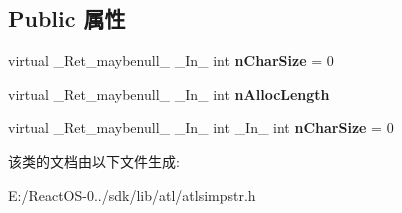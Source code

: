 \subsection*{Public 属性}
\begin{DoxyCompactItemize}
\item 
\mbox{\label{class_a_t_l_1_1_i_atl_string_mgr_a20e9f6b0e07ebb5f1c0db7318c32667d}} 
virtual \+\_\+\+Ret\+\_\+maybenull\+\_\+ \+\_\+\+In\+\_\+ int {\bfseries n\+Char\+Size} = 0
\item 
\mbox{\label{class_a_t_l_1_1_i_atl_string_mgr_aecb8a30e02b2c7e93bdbe5df70f49eec}} 
virtual \+\_\+\+Ret\+\_\+maybenull\+\_\+ \+\_\+\+In\+\_\+ int {\bfseries n\+Alloc\+Length}
\item 
\mbox{\label{class_a_t_l_1_1_i_atl_string_mgr_a742bf466f3f9afaa0cd2d29098258853}} 
virtual \+\_\+\+Ret\+\_\+maybenull\+\_\+ \+\_\+\+In\+\_\+ int \+\_\+\+In\+\_\+ int {\bfseries n\+Char\+Size} = 0
\end{DoxyCompactItemize}


该类的文档由以下文件生成\+:\begin{DoxyCompactItemize}
\item 
E\+:/\+React\+O\+S-\/0../sdk/lib/atl/atlsimpstr.\+h\end{DoxyCompactItemize}
